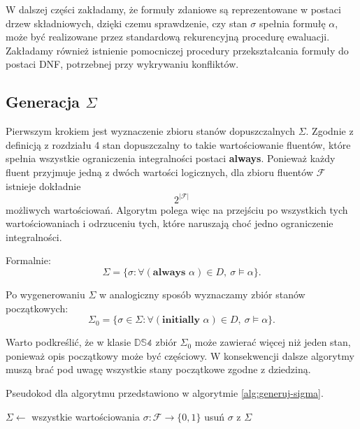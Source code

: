 \documentclass[11pt,a4paper]{article}
\theoremstyle{definition}
\begin{document}
W dalszej części zakładamy, że formuły zdaniowe są reprezentowane w postaci drzew składniowych, dzięki czemu sprawdzenie, czy stan $\sigma$ spełnia formułę $\alpha$, może być realizowane przez standardową rekurencyjną procedurę ewaluacji. Zakładamy również istnienie pomocniczej procedury przekształcania formuły do postaci DNF, potrzebnej przy wykrywaniu konfliktów.

\subsection{Generacja \texorpdfstring{$\Sigma$}{Sigma}}

Pierwszym krokiem jest wyznaczenie zbioru stanów dopuszczalnych $\Sigma$. Zgodnie z definicją z rozdziału 4 stan dopuszczalny to takie wartościowanie fluentów, które spełnia wszystkie ograniczenia integralności postaci \textbf{always}. Ponieważ każdy fluent przyjmuje jedną z dwóch wartości logicznych, dla zbioru fluentów $\mathcal{F}$ istnieje dokładnie
\[
2^{|\mathcal{F}|}
\]
możliwych wartościowań. Algorytm polega więc na przejściu po wszystkich tych wartościowaniach i odrzuceniu tych, które naruszają choć jedno ograniczenie integralności.

Formalnie:
\[
\Sigma = \{\sigma : \forall (\textbf{always } \alpha)\in D,\ \sigma \models \alpha\}.
\]

Po wygenerowaniu $\Sigma$ w analogiczny sposób wyznaczamy zbiór stanów początkowych:
\[
\Sigma_0 = \{\sigma \in \Sigma : \forall (\textbf{initially } \alpha)\in D,\ \sigma \models \alpha\}.
\]

Warto podkreślić, że w klasie $\mathbb{DS4}$ zbiór $\Sigma_0$ może zawierać więcej niż jeden stan, ponieważ opis początkowy może być częściowy. W konsekwencji dalsze algorytmy muszą brać pod uwagę wszystkie stany początkowe zgodne z dziedziną.

Pseudokod dla algorytmu przedstawiono w algorytmie \ref{alg:generuj-sigma}.

\begin{algorithm}[H]
\caption{Pseudokod dla algorytmu generującego zbiór stanów dopuszczalnych}
\label{alg:generuj-sigma}
\begin{algorithmic}[1]
        \State $\Sigma \gets$ wszystkie wartościowania $\sigma \colon \mathcal{F} \to \{0,1\}$
        \ForAll{$\sigma \in \Sigma$}
                \If{$\sigma \not\models \alpha$}
                    \State usuń $\sigma$ z $\Sigma$
                \EndIf
            \EndFor
        \EndFor
        
        \Return{$\Sigma$}
    \EndProcedure
\end{algorithmic}
\end{algorithm}
\end{document}
